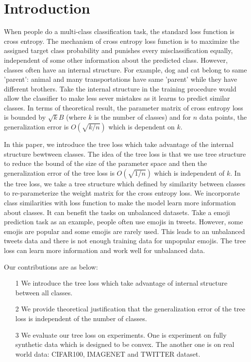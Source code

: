 \documentclass[twoside]{article}
\begin{document}
\section{Introduction}

When people do a multi-class classification task, the standard loss function is cross entropy.
The mechanism of cross entropy loss function is to maximize the assigned target class probability and punishes every misclassification equally, independent of some other information about the predicted class.
However, classes often have an internal structure. 
For example, dog and cat belong to same 'parent': animal and many transportations have same 'parent' while they have different brothers. Take the internal structure in the training procedure would allow the classifier to make less sever mistakes as it learns to predict similar classes.
In terms of theoretical result, the parameter matrix of cross entropy loss is bounded by $\sqrt{k}B$ (where $k$ is the number of classes) and for $n$ data points, the generalization error is $O(\sqrt{k/n})$ which is dependent on $k$.

In this paper, we introduce the tree loss which take advantage of the internal structure bewtween classes.
The idea of the tree loss is that we use tree structure to reduce the bound of the size of the parameter space and then the generalization error of the tree loss is $O(\sqrt{1/n})$ which is independent of $k$.
In the tree loss, we take a tree structure which defined by similarity between classes to re-parameterize the weight matrix for the cross entropy loss.
We incorporate class similarities with loss function to make the model learn more information about classes.
It can benefit the tasks on unbalanced datasets.
Take a emoji prediction task as an example, people often use emojis in tweets.
However, some emojis are popular and some emojis are rarely used.
This leads to an unbalanced tweets data and there is not enough training data for unpopular emojis.
The tree loss can learn more information and work well for unbalanced data.


Our contributions are as below:
\begin{itemize}
    \item [1] 
    We introduce the tree loss which take advantage of internal structure between all classes.
    \item [2] 
    We provide theoretical justification that the generalization error of the tree loss is independent of the number of classes.
    \item [3]
    We evaluate our tree loss on experiments. One is experiment on fully synthetic data which is designed to be convex. The another one is on real world data: CIFAR100, IMAGENET and TWITTER dataset. 
    
\end{itemize}
\end{document}
